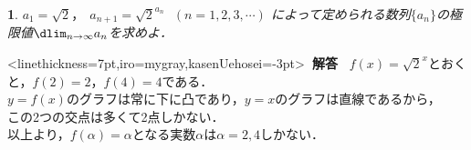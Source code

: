 \documentclass[10pt,
b5paper,
fleqn,
dvipdfmx,
uplatex
]{jsarticle}
\newtheorem{question}[Question]{}
\newcommand{\bqu}{\begin{question}}
\newcommand{\equ}{\end{question}}
\newcommand{\benu}{\begin{enumerate}}
\newcommand{\sq}{\textstyle\sqrt}
\newcommand{\C}{\text{C}}
\newenvironment{leftbbar}{%
\def\FrameCommand{\color{mygray} \vrule width 5pt \hspace{1zw}
\color{black}}%
\MakeFramed {\advance\hsize-\width \FrameRestore}}%
{\endMakeFramed}
\newenvironment{解答}{
\hspace{-2zw}\phkasen<linethickness=7pt,iro=mygray,kasenUehosei=-3pt>{\bf \large \ 解答\ }\vspace{-1zw}\begin{leftbbar}}{\end{leftbbar}}
\newif\ifkaisetu
\begin{document}
{%

\bqu
$a_1=\sq 2，\ \ a_{n+1} =\sq{2}^{a_n}\ \ \ (n=1,2,3,\cdots)$
によって定められる数列$\{a_n\}$の極限値$\dlim_{n \to \infty}a_n$を求めよ．
\equ

\ifkaisetu
\begin{解答}
$f(x)=\sq{2}^{x}$とおくと，$f(2)=2$，$f(4)=4$である．\\
$y=f(x)$のグラフは常に下に凸であり，$y=x$のグラフは直線であるから，\\
この2つの交点は多くて2点しかない．\\
以上より，$f(\alpha)=\alpha$となる実数$\alpha$は$\alpha=2,4$しかない．


\end{解答}}
\end{document}
